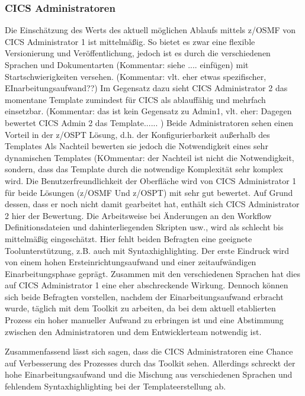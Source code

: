 \subsubsection{CICS Administratoren}
Die Einschätzung des Werts des aktuell möglichen Ablaufs mittels z/OSMF von CICS Administrator 1 ist mittelmäßig.
So bietet es zwar eine flexible Versionierung und Veröffentlichung, jedoch ist es durch die verschiedenen Sprachen und Dokumentarten (Kommentar: siehe ....  einfügen)  mit Startschwierigkeiten versehen. (Kommentar: vlt. eher etwas spezifischer, EInarbeitungsaufwand??)
Im Gegensatz dazu sieht CICS Administrator 2 das momentane Template zumindest für CICS als ablauffähig und mehrfach einsetzbar. (Kommentar: das ist kein Gegensatz zu Admin1, vlt. eher: Dagegen bewertet CICS Admin 2 das Template...... )
Beide Administratoren sehen einen Vorteil in der z/OSPT Lösung, d.h. der Konfigurierbarkeit  außerhalb des Templates 
Als Nachteil bewerten sie jedoch die Notwendigkeit eines sehr dynamischen Templates (KOmmentar: der Nachteil ist nicht die Notwendigkeit, sondern, dass das Template durch die notwendige Komplexität sehr komplex wird.
Die Benutzerfreundlichkeit der Oberfläche wird von CICS Administrator 1 für beide Lösungen (z/OSMF Und z/OSPT) mit sehr gut bewertet.
Auf Grund dessen, dass er noch nicht damit gearbeitet hat, enthält sich CICS Administrator 2 hier der Bewertung.
Die Arbeitsweise bei Änderungen an den Workflow Definitionsdateien und dahinterliegenden Skripten usw., wird als schlecht bis mittelmäßig eingeschätzt.
Hier fehlt beiden Befragten eine geeignete Toolunterstützung, z.B. auch mit Syntaxhighlighting.
Der erste Eindruck wird von einem hohen Ersteinrichtungsaufwand und einer zeitaufwändigen Einarbeitungsphase geprägt.
Zusammen mit den verschiedenen Sprachen hat dies auf CICS Administrator 1 eine eher abschreckende Wirkung.
Dennoch können sich beide Befragten vorstellen, nachdem der Einarbeitungsaufwand erbracht wurde, täglich mit dem Toolkit zu arbeiten, da bei dem aktuell etablierten Prozess ein hoher manueller Aufwand zu erbringen ist und eine Abstimmung zwischen den Administratoren und dem Entwicklerteam notwendig ist.

Zusammenfassend lässt sich sagen, dass die CICS Administratoren eine Chance auf Verbesserung des Prozesses durch das Toolkit sehen.
Allerdings schreckt der hohe Einarbeitungsaufwand und die Mischung aus verschiedenen Sprachen und fehlendem Syntaxhighlighting bei der Templateerstellung ab.

